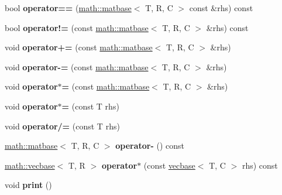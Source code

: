 \begin{DoxyCompactItemize}
\item 
\hypertarget{classmath_1_1matbase_ad2cddf6b59ecc1e0868a85dac9e99d93}{
bool {\bfseries operator==} (\hyperlink{classmath_1_1matbase}{math::matbase}$<$ T, R, C $>$ const \&rhs) const }
\label{classmath_1_1matbase_ad2cddf6b59ecc1e0868a85dac9e99d93}

\item 
\hypertarget{classmath_1_1matbase_aa103abdbe2d3c8026543c277e58251bc}{
bool {\bfseries operator!=} (const \hyperlink{classmath_1_1matbase}{math::matbase}$<$ T, R, C $>$ \&rhs) const }
\label{classmath_1_1matbase_aa103abdbe2d3c8026543c277e58251bc}

\item 
\hypertarget{classmath_1_1matbase_a4540659a324baac820e5c7edccefa621}{
void {\bfseries operator+=} (const \hyperlink{classmath_1_1matbase}{math::matbase}$<$ T, R, C $>$ \&rhs)}
\label{classmath_1_1matbase_a4540659a324baac820e5c7edccefa621}

\item 
\hypertarget{classmath_1_1matbase_a90bd1ca9d1b8667867255eadab0cb1b8}{
void {\bfseries operator-\/=} (const \hyperlink{classmath_1_1matbase}{math::matbase}$<$ T, R, C $>$ \&rhs)}
\label{classmath_1_1matbase_a90bd1ca9d1b8667867255eadab0cb1b8}

\item 
\hypertarget{classmath_1_1matbase_a5d5264e6f6fc9d3383c876fab45a04c0}{
void {\bfseries operator$\ast$=} (const \hyperlink{classmath_1_1matbase}{math::matbase}$<$ T, R, C $>$ \&rhs)}
\label{classmath_1_1matbase_a5d5264e6f6fc9d3383c876fab45a04c0}

\item 
\hypertarget{classmath_1_1matbase_ac698cb1efc036bbb1864463e34a0abb5}{
void {\bfseries operator$\ast$=} (const T rhs)}
\label{classmath_1_1matbase_ac698cb1efc036bbb1864463e34a0abb5}

\item 
\hypertarget{classmath_1_1matbase_ae1c0e4c5303a59d32623b717c5d4f486}{
void {\bfseries operator/=} (const T rhs)}
\label{classmath_1_1matbase_ae1c0e4c5303a59d32623b717c5d4f486}

\item 
\hypertarget{classmath_1_1matbase_ad0238006bac3f0ce7cffa87e03ae9f23}{
\hyperlink{classmath_1_1matbase}{math::matbase}$<$ T, R, C $>$ {\bfseries operator-\/} () const }
\label{classmath_1_1matbase_ad0238006bac3f0ce7cffa87e03ae9f23}

\item 
\hypertarget{classmath_1_1matbase_a41a279dda215d552a1069fbc8a3c69ab}{
\hyperlink{classmath_1_1vecbase}{math::vecbase}$<$ T, R $>$ {\bfseries operator$\ast$} (const \hyperlink{classmath_1_1vecbase}{vecbase}$<$ T, C $>$ rhs) const }
\label{classmath_1_1matbase_a41a279dda215d552a1069fbc8a3c69ab}

\item 
\hypertarget{classmath_1_1matbase_a47da58f9b0b64ecf5f1473a15ad11ce8}{
void {\bfseries print} ()}
\label{classmath_1_1matbase_a47da58f9b0b64ecf5f1473a15ad11ce8}

\end{DoxyCompactItemize}
